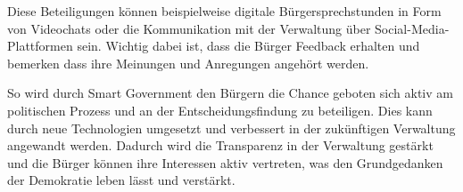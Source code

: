 \par 
Diese Beteiligungen können beispielweise digitale Bürgersprechstunden in Form von Videochats oder die Kommunikation mit der Verwaltung über Social-Media-Plattformen sein.
Wichtig dabei ist, dass die Bürger Feedback erhalten und bemerken dass ihre Meinungen und Anregungen angehört werden.
\par
So wird durch Smart Government den Bürgern die Chance geboten sich aktiv am politischen Prozess und an der Entscheidungsfindung zu beteiligen. 
Dies kann durch neue Technologien umgesetzt und verbessert in der zukünftigen Verwaltung angewandt werden.
Dadurch wird die Transparenz in der Verwaltung gestärkt und die Bürger können ihre Interessen aktiv vertreten, was den Grundgedanken der Demokratie leben lässt und verstärkt.